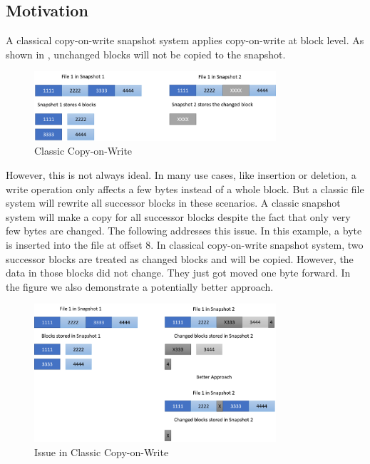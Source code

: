 \subsection{Motivation}

    A classical copy-on-write snapshot system applies copy-on-write at block level. As shown in , unchanged blocks will not be copied to the snapshot.

\begin{figure}[t]
\centering
\includegraphics[width=0.8\textwidth]{Chapter-4/figs/fig4.png}
\caption{Classic Copy-on-Write}
\label{fig:classic_cow}
\end{figure}

    However, this is not always ideal. In many use cases, like insertion or deletion, a write operation only affects a few bytes instead of a whole block. But a classic file system will rewrite all successor blocks in these scenarios. A classic snapshot system will make a copy for all successor blocks despite the fact that only very few bytes are changed. The following  addresses this issue. In this example, a byte is inserted into the file at offset 8. In classical copy-on-write snapshot system, two successor blocks are treated as changed blocks and will be copied. However, the data in those blocks did not change. They just got moved one byte forward. In the figure we also demonstrate a potentially better approach.

\begin{figure}[t]
\centering
\includegraphics[width=0.8\textwidth]{Chapter-4/figs/fig5.png}
\caption{Issue in Classic Copy-on-Write}
\label{fig:issue_classic_cow}
\end{figure}
 

